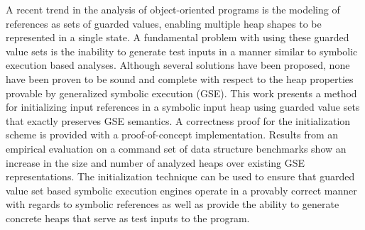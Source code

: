 A recent trend in the analysis of object-oriented programs is the
modeling of references as sets of guarded values, enabling multiple
heap shapes to be represented in a single state.  A fundamental
problem with using these guarded value sets is the inability to
generate test inputs in a manner similar to symbolic execution based
analyses.
Although several solutions have been proposed, none have been proven
to be sound and complete with respect to the heap properties provable
by generalized symbolic execution (GSE). This work presents a method for initializing input references
in a symbolic input heap using guarded value sets that exactly
preserves GSE semantics. A correctness proof for the initialization
scheme is provided with a proof-of-concept implementation. Results from an empirical evaluation on a command set of \gsetxt{} data structure benchmarks show an increase in the
size and number of analyzed heaps over existing GSE
representations. The initialization technique can be used to ensure
that guarded value set based symbolic execution engines operate in a
provably correct manner with regards to symbolic references as well as
provide the ability to generate concrete heaps that serve as test
inputs to the program.



